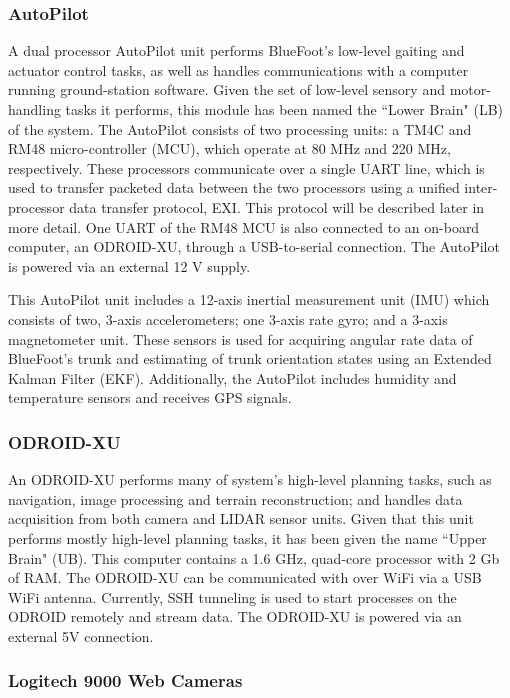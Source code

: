			\subsubsection{AutoPilot}

				A dual processor AutoPilot unit performs BlueFoot's low-level gaiting and actuator control tasks, as well as handles communications with a computer running ground-station software. Given the set of low-level sensory and motor-handling tasks it performs, this module has been named the ``Lower Brain" (LB) of the system. The AutoPilot consists of two processing units: a TM4C and RM48 micro-controller (MCU), which operate at 80 MHz and 220 MHz, respectively. These processors communicate over a single UART line, which is used to transfer packeted data between the two processors using a unified inter-processor data transfer protocol, EXI. This protocol will be described later in more detail. One UART of the RM48 MCU is also connected to an on-board computer, an ODROID-XU, through a USB-to-serial connection. The AutoPilot is powered via an external 12 V supply.
	
				This AutoPilot unit includes a 12-axis inertial measurement unit (IMU) which consists of two, 3-axis accelerometers; one 3-axis rate gyro; and a 3-axis magnetometer unit. These sensors is used for acquiring angular rate data of BlueFoot's trunk and estimating of trunk orientation states using an Extended Kalman Filter (EKF). Additionally, the AutoPilot includes humidity and temperature sensors and receives GPS signals.
				
			\subsubsection{ODROID-XU}

				An ODROID-XU performs many of system's high-level planning tasks, such as navigation, image processing and terrain reconstruction; and handles data acquisition from both camera and LIDAR sensor units. Given that this unit performs mostly high-level planning tasks, it has been given the name ``Upper Brain" (UB). This computer contains a 1.6 GHz, quad-core processor with 2 Gb of RAM. The ODROID-XU can be communicated with over WiFi via a USB WiFi antenna. Currently, SSH tunneling is used to start processes on the ODROID remotely and stream data. The ODROID-XU is powered via an external 5V connection.

			\subsubsection{Logitech 9000 Web Cameras}

